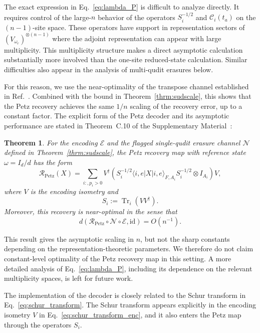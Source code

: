 \documentclass[10pt,twocolumn,superscriptaddress,aps,amsmath,amssymb,citeautoscript,floatfix,prx,longbibliography]{revtex4-2}
\newtheorem{theorem}{Theorem}
\theoremstyle{plain}
\theoremstyle{plain}
\theoremstyle{plain}
\theoremstyle{plain}
\theoremstyle{plain}
\theoremstyle{plain}
\begin{document}
The exact expression in Eq.~\eqref{eq:lambda_P} is difficult to analyze directly. It requires control of the large-$n$ behavior of the operators $S_i^{-1/2}$ and $\mathcal C_i(t_a)$ on the $(n-1)$-site space. These operators have support in representation sectors of $(V_{\omega_r})^{\otimes(n-1)}$ where the adjoint representation can appear with large multiplicity. This multiplicity structure makes a direct asymptotic calculation substantially more involved than the one-site reduced-state calculation. Similar difficulties also appear in the analysis of multi-qudit erasures below.

For this reason, we use the near-optimality of the transpose channel established in Ref.~\cite{Ng2010}. Combined with the bound in Theorem~\ref{thrm:sudscale}, this shows that the Petz recovery achieves the same $1/n$ scaling of the recovery error, up to a constant factor. The explicit form of the Petz decoder and its asymptotic performance are stated in Theorem~C.10 of the Supplementary Material~\cite{SuppMat}:

\begin{theorem}
For the encoding $\mathcal E$ and the flagged single-qudit erasure channel $\mathcal N$ defined in Theorem~\ref{thrm:sudscale}, the Petz recovery map with reference state $\omega=I_d/d$ has the form
$$
\mathcal R_{\mathrm{Petz}}(X)
=
\sum_{i:,p_i>0}
V^\dagger
\left(
S_i^{-1/2}
\langle i,e|X|i,e\rangle_{F,A_i}
S_i^{-1/2}
\otimes I_{A_i}
\right)
V,
$$
where $V$ is the encoding isometry and
$$
S_i
:=
\operatorname{Tr}_i\left(VV^\dagger\right).
$$
Moreover, this recovery is near-optimal in the sense that
$$
    d\left(
    \mathcal R_{\mathrm{Petz}}
    \circ
    \mathcal N
    \circ
    \mathcal E,
    \mathrm{id}
    \right)
    =
    O(n^{-1}) .
$$
\end{theorem}

This result gives the asymptotic scaling in $n$, but not the sharp constants depending on the representation-theoretic parameters. We therefore do not claim constant-level optimality of the Petz recovery map in this setting. A more detailed analysis of Eq.~\eqref{eq:lambda_P}, including its dependence on the relevant multiplicity spaces, is left for future work.

The implementation of the decoder is closely related to the Schur transform in Eq.~\eqref{eq:schur_transform}. The Schur transform appears explicitly in the encoding isometry $V$ in Eq.~\eqref{eq:schur_transform_enc}, and it also enters the Petz map through the operators $S_i$.
\end{document}
